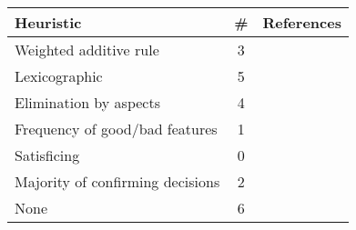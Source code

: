 
\begin{supertabular}[c]{lcp{8em}}
\toprule
Heuristic & \# & References\tabularnewline
\midrule
Weighted additive rule & 3 & \citep{Amirkhanov:2010,Brecheisen:2009,Bergner:2013}\tabularnewline
Lexicographic & 5 & \citep{Marks:1997,Berger:2011,Torsney-Weir:2011,Afzal:2011,Luboschik:2014}\tabularnewline
Elimination by aspects & 4 & \citep{Matkovic:2009,Spence:1995,Waser:2010,Booshehrian:2012}\tabularnewline
Frequency of good/bad features & 1 & \citep{Coffey:2013}\tabularnewline
Satisficing & 0 & \tabularnewline
Majority of confirming decisions & 2 & \citep{Bruckner:2010,Pretorius:2011}\tabularnewline
None & 6 & \citep{Matkovic:2008,Konyha:2006,Guo:2009,Potter:2009,Piringer:2010,Unger:2012}\tabularnewline
\bottomrule
\end{supertabular}

